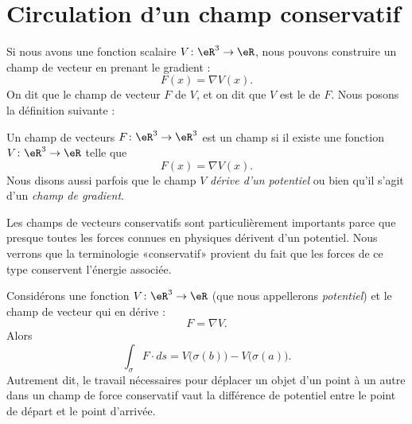 \section{Circulation d'un champ conservatif}

Si nous avons une fonction scalaire $V\colon \eR^3\to \eR$, nous pouvons construire un champ de vecteur en prenant le gradient :
\begin{equation}
	F(x)=\nabla V(x).
\end{equation}
On dit que le champ de vecteur $F$  de $V$, et on dit que $V$ est le  de $F$. Nous posons la définition suivante :
\begin{definition}
	Un champ de vecteurs $F\colon \eR^3\to \eR^3$ est un champ  si il existe une fonction $V\colon \eR^3\to \eR$ telle que
	\begin{equation}
		F(x)=\nabla V(x).
	\end{equation}
	Nous disons aussi parfois que le champ $V$ \emph{dérive d'un potentiel} ou bien qu'il s'agit d'un \emph{champ de gradient}.
\end{definition}

Les champs de vecteurs conservatifs sont particulièrement importants parce que presque toutes les forces connues en physiques dérivent d'un potentiel. Nous verrons que la terminologie «conservatif» provient du fait que les forces de ce type conservent l'énergie associée.


\begin{proposition}
	Considérons une fonction $V\colon \eR^3\to \eR$ (que nous appellerons \emph{potentiel}) et le champ de vecteur qui en dérive :
	\begin{equation}
		F=\nabla V.
	\end{equation}
	Alors
	\begin{equation}
		\int_{\sigma}F\cdot ds=V\big( \sigma(b) \big)-V\big( \sigma(a) \big).
	\end{equation}
	Autrement dit, le travail nécessaires pour déplacer un objet d'un point à un autre dans un champ de force conservatif vaut la différence de potentiel entre le point de départ et le point d'arrivée.
\end{proposition}


